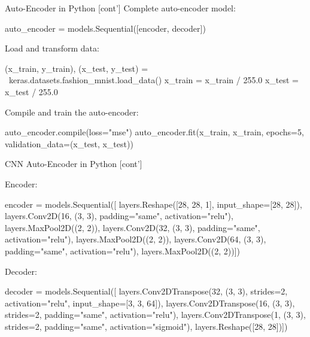 \documentclass[ignorenonframetext,xcolor=x11names]{beamer}
\begin{document}
\begin{frame}[fragile]{Auto-Encoder in Python \small [cont']}
Complete auto-encoder model:

\begin{pythoncode}
auto_encoder = models.Sequential([encoder, decoder])
\end{pythoncode}

Load and transform data:
\begin{pythoncode}
(x_train, y_train), (x_test, y_test) = \
                    keras.datasets.fashion_mnist.load_data()
x_train = x_train / 255.0
x_test = x_test / 255.0
\end{pythoncode}

Compile and train the auto-encoder:
\begin{pythoncode}
auto_encoder.compile(loss="mse")
auto_encoder.fit(x_train, x_train, 
                 epochs=5, validation_data=(x_test, x_test))
\end{pythoncode}
\end{frame}

\begin{frame}[fragile]{CNN Auto-Encoder in Python \small [cont']}

Encoder:
\begin{pythoncode}
encoder = models.Sequential([
    layers.Reshape([28, 28, 1], input_shape=[28, 28]),
    layers.Conv2D(16, (3, 3), 
                  padding="same", activation="relu"),
    layers.MaxPool2D((2, 2)),
    layers.Conv2D(32, (3, 3), 
                  padding="same", activation="relu"),
    layers.MaxPool2D((2, 2)),
    layers.Conv2D(64, (3, 3), 
                  padding="same", activation="relu"),
    layers.MaxPool2D((2, 2))])
\end{pythoncode}

Decoder:
\begin{pythoncode}
decoder = models.Sequential([
    layers.Conv2DTranspose(32, (3, 3), strides=2, 
               activation="relu", input_shape=[3, 3, 64]),
    layers.Conv2DTranspose(16, (3, 3), strides=2, 
               padding="same", activation="relu"),
    layers.Conv2DTranspose(1, (3, 3), strides=2, 
               padding="same", activation="sigmoid"),
    layers.Reshape([28, 28])])
\end{pythoncode}
\end{frame}
\end{document}
